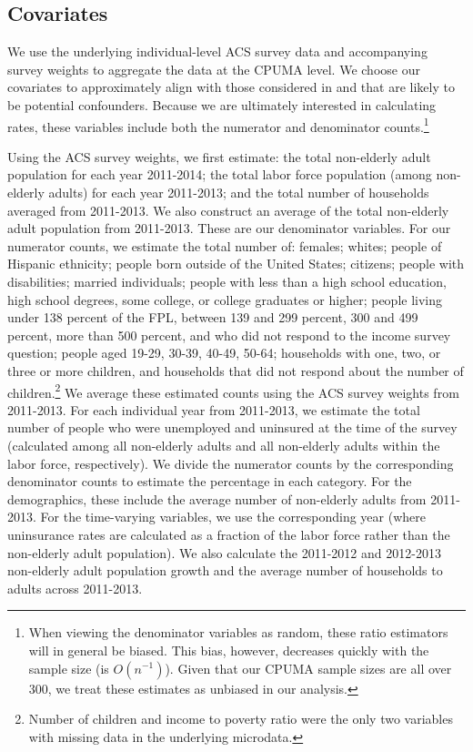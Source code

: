 \documentclass[aoas]{imsart}
\theoremstyle{plain}
\theoremstyle{remark}
\begin{document}
\subsection{Covariates}

We use the underlying individual-level ACS survey data and accompanying survey weights to aggregate the data at the CPUMA level. We choose our covariates to approximately align with those considered in \cite{courtemanche2017early} and that are likely to be potential confounders. Because we are ultimately interested in calculating rates, these variables include both the numerator and denominator counts.\footnote{When viewing the denominator variables as random, these ratio estimators will in general be biased. This bias, however, decreases quickly with the sample size (is $O(n^{-1})$). Given that our CPUMA sample sizes are all over 300, we treat these estimates as unbiased in our analysis.}

Using the ACS survey weights, we first estimate: the total non-elderly adult population for each year 2011-2014; the total labor force population (among non-elderly adults) for each year 2011-2013; and the total number of households averaged from 2011-2013. We also construct an average of the total non-elderly adult population from 2011-2013. These are our denominator variables. For our numerator counts, we estimate the total number of: females; whites; people of Hispanic ethnicity; people born outside of the United States; citizens; people with disabilities; married individuals; people with less than a high school education, high school degrees, some college, or college graduates or higher; people living under 138 percent of the FPL, between 139 and 299 percent, 300 and 499 percent, more than 500 percent, and who did not respond to the income survey question; people aged 19-29, 30-39, 40-49, 50-64; households with one, two, or three or more children, and households that did not respond about the number of children.\footnote{Number of children and income to poverty ratio were the only two variables with missing data in the underlying microdata.} We average these estimated counts using the ACS survey weights from 2011-2013. For each individual year from 2011-2013, we estimate the total number of people who were unemployed and uninsured at the time of the survey (calculated among all non-elderly adults and all non-elderly adults within the labor force, respectively). We divide the numerator counts by the corresponding denominator counts to estimate the percentage in each category. For the demographics, these include the average number of non-elderly adults from 2011-2013. For the time-varying variables, we use the corresponding year (where uninsurance rates are calculated as a fraction of the labor force rather than the non-elderly adult population). We also calculate the 2011-2012 and 2012-2013 non-elderly adult population growth and the average number of households to adults across 2011-2013. 
\end{document}
